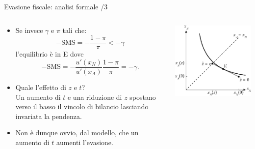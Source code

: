 \documentclass[aspectratio=64,12pt]{beamer}
\begin{document}
\begin{frame}{Evasione fiscale: analisi formale /3}
\begin{columns}
\begin{column}{.45\columnwidth}
\begin{itemize}
\item Se invece $\gamma$ e $\pi$ tali che:
$$ -\text{SMS}=-\frac{1-\pi}{\pi} <-\gamma $$
l'equilibrio è in E dove
\begin{equation*}
 -\text{SMS} = -\frac{u'(x_N)}{u'(x_A)}\frac{1-\pi}{\pi}=-\gamma.
\end{equation*}
\item Quale l'effetto di $z$ e $t$?\\ Un aumento di $t$ e una riduzione di $z$ spostano verso il basso il vincolo di bilancio lasciando invariata la pendenza.
  \item Non è dunque ovvio, dal modello, che un aumento di $t$ aumenti l'evasione.
\end{itemize}
\end{column}
\begin{column}{.55\columnwidth}
\begin{center}
\includegraphics[width=\textwidth]{./figure/evasione-2.pdf}
\end{center}
\end{column}
\end{columns}
\end{frame}
\end{document}
